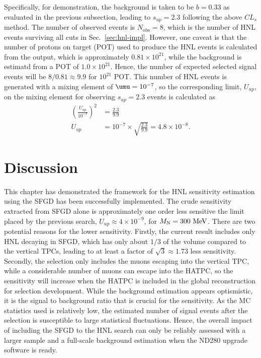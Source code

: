         Specifically, for demonstration, the background is taken to be $b=0.33$ as evaluated in the previous subsection, leading to $s_{up}=2.3$ following the above $CL_s$ method.
        The number of observed events is $N_{\textrm{obs}}=8$, which is the number of HNL events surviving all cuts in Sec.~\ref{sec:hnl-impl}.
        However, one caveat is that the number of protons on target (POT) used to produce the HNL events is calculated from the  output, which is approximately $0.81\times10^{21}$, while the background is estimatd from a POT of $1.0\times10^{21}$.
        Hence, the number of expected selected signal events will be $8/0.81\approx9.9$ for $10^{21}$ POT.
        This number of HNL events is generated with a mixing element of $\umu = 10^{-7}$, so the corresponding limit, $U_{up}$, on the mixing element for observing $s_{up}=2.3$ events is calculated as 
        \begin{align}
            \left(\frac{U_{up}}{10^{-7}}\right)^2 & =  \frac{2.3}{9.9} \\
            U_{up} & = 10^{-7} \times \sqrt{\frac{2.3}{9.9}} = 4.8\times10^{-8}.
        \end{align}

    \section{Discussion}
        This chapter has demonstrated the framework for the HNL sensitivity estimation using the SFGD has been successfully implemented.
        The crude sensitivity extracted from SFGD alone is approximately one order less sensitive the limit placed by the previous search, $U_{up}\approx4\times10^{-9}$, for $M_{\textrm{N}}=300~\textrm{MeV}$.
        There are two potential reasons for the lower sensitivity.
        Firstly, the current result includes only HNL decaying in SFGD, which has only about $1/3$ of the volume compared to the vertical TPCs, leading to at least a factor of $\sqrt{3}\approx1.73$ less sensitivity.
        Secondly, the selection only includes the muons escaping into the vertical TPC, while a considerable number of muons can escape into the HATPC, so the sensitivity will increase when the HATPC is included in the global reconstruction for selection development.
        While the background estimation appears optismistic, it is the signal to background ratio that is crucial for the sensitivity.
        As the MC statistics used is relatively low, the estimated number of signal events after the selection is susceptible to large statistical fluctuations. 
        Hence, the overall impact of including the SFGD to the HNL search can only be reliably assessed 
        with a larger sample and a full-scale background estimation when the ND280 upgrade software is ready.
        
